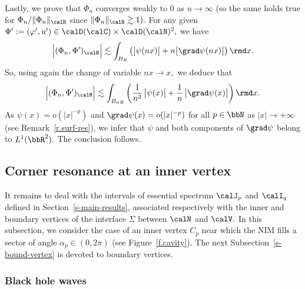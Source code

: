 \begin{proofc}
\begin{step}\label{proofprop3.6.3}
Lastly, we prove that $\Phi_n$ converges weakly to 0 as $n \to \infty$ (so the same holds true for $\Phi_n/\|\Phi_n\|_\calH$ since $\| \Phi_n \|_\calH \gtrsim 1).$ For any given $\Phi' := (\varphi',u') \in \calD(\calC) \times \calD(\calN)^2,$ we have
\[
\Big| (\Phi_n,\Phi')_\calH \Big|
\lesssim
\int_{B_R} \left(\big| \psi(nx) \big| + n \big| \grad\psi(nx) \big| \right) \rmd x.
\]
So, using again the change of variable $nx \to x,$ we deduce that
\[
\Big| (\Phi_n,\Phi')_\calH \Big|
\lesssim
\int_{B_{nR}} \left(\frac{1}{n^2}\,\big| \psi(x) \big| + \frac{1}{n}\,\big| \grad\psi(x) \big| \right) \rmd x.
\]
As $\psi(x) = o(|x|^{-p})$ and $\grad \psi(x) = o(|x|^{-p})$ for all $p \in \bbN$ as $|x|\to +\infty$ (see Remark~\ref{r.surf-res}), we infer that $\psi$ and both components of $\grad \psi$ belong to $L^1(\bbR^2).$ The conclusion follows.
\end{step}
\end{proofc}

\subsection{Corner resonance at an inner vertex}\label{s-inner-vertex}
It remains to deal with the intervals of essential spectrum $\calJ_p$ and $\calI_q$ defined in Section~\ref{s-main-results}, associated respectively with the inner and boundary vertices of the interface $\Sigma$ between $\calN$ and $\calV.$ In this subsection, we consider the case of an inner vertex $C_p$ near which the NIM fills a sector of angle $\alpha_p \in (0,2\pi)$ (see Figure~\ref{f.cavity}). The next Subsection~\ref{s-bound-vertex} is devoted to boundary vertices.

\subsubsection{Black hole waves}\label{subsub3.4.1}


